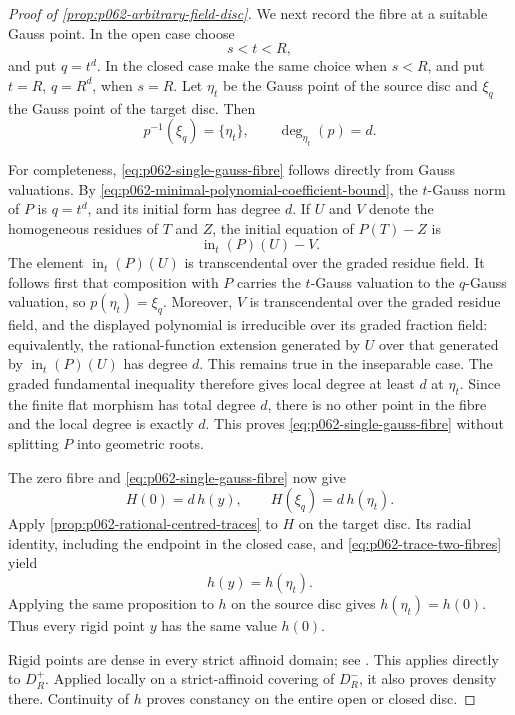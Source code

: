 \begin{proof}[Proof of \cref{prop:p062-arbitrary-field-disc}]
We next record the fibre at a suitable Gauss point.  In the open case choose
\begin{equation}\label{eq:p062-radius-above-rigid-point}
                              s<t<R,
\end{equation}
and put \(q=t^d\).  In the closed case make the same choice when \(s<R\),
and put \(t=R\), \(q=R^d\), when \(s=R\).  Let \(\eta_t\) be the Gauss
point of the source disc and \(\xi_q\) the Gauss point of the target disc.
Then
\begin{equation}\label{eq:p062-single-gauss-fibre}
                         p^{-1}(\xi_q)=\{\eta_t\},
 \qquad \deg_{\eta_t}(p)=d.
\end{equation}

For completeness, \eqref{eq:p062-single-gauss-fibre} follows directly from
Gauss valuations.  By
\eqref{eq:p062-minimal-polynomial-coefficient-bound}, the \(t\)-Gauss norm
of \(P\) is \(q=t^d\), and its initial form has degree \(d\).  If
\(U\) and \(V\) denote the homogeneous residues of \(T\) and \(Z\), the
initial equation of \(P(T)-Z\) is
\[
                      \operatorname{in}_t(P)(U)-V.
\]
The element \(\operatorname{in}_t(P)(U)\) is transcendental over the
graded residue field.  It follows first that composition with \(P\) carries
the \(t\)-Gauss valuation to the \(q\)-Gauss valuation, so
\(p(\eta_t)=\xi_q\).  Moreover, \(V\) is transcendental over the graded
residue field, and the displayed
polynomial is irreducible over its graded fraction field: equivalently,
the rational-function extension generated by \(U\) over that generated by
\(\operatorname{in}_t(P)(U)\) has degree \(d\).  This remains true in the
inseparable case.  The graded fundamental inequality therefore gives local
degree at least \(d\) at \(\eta_t\).  Since the finite flat morphism has total
degree \(d\), there is no other point in the fibre and the local degree is
exactly \(d\).  This proves \eqref{eq:p062-single-gauss-fibre} without
splitting \(P\) into geometric roots.

The zero fibre and \eqref{eq:p062-single-gauss-fibre} now give
\begin{equation}\label{eq:p062-trace-two-fibres}
                         H(0)=d\,h(y),
 \qquad                  H(\xi_q)=d\,h(\eta_t).
\end{equation}
Apply \cref{prop:p062-rational-centred-traces} to \(H\) on the target
disc.  Its radial identity, including the endpoint in the closed case,
and \eqref{eq:p062-trace-two-fibres} yield
\begin{equation}\label{eq:p062-rigid-to-gauss}
                              h(y)=h(\eta_t).
\end{equation}
Applying the same proposition to \(h\) on the source disc gives
\(h(\eta_t)=h(0)\).  Thus every rigid point \(y\) has the same value
\(h(0)\).

Rigid points are dense in every strict affinoid domain; see
\cite[Proposition~2.1.15]{Berk12}.  This applies directly to \(D_R^+\).
Applied locally on a strict-affinoid covering of \(D_R^-\), it also proves
density there.  Continuity of \(h\) proves constancy on the entire open or
closed disc.
\end{proof}
